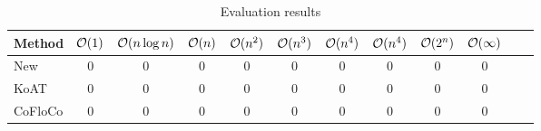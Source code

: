 \begin{table}
  \begin{center}
    \label{tab:evaluation}
    \begin{tabular}{l|c|c|c|c|c|c|c|c|c|c|c}
      Method & $\mathcal{O}(1)$ & $\mathcal{O}(n \log n)$ & $\mathcal{O}(n)$ & $\mathcal{O}(n^2)$ & $\mathcal{O}(n^3)$ & $\mathcal{O}(n^4)$ & $\mathcal{O}(n^4)$ & $\mathcal{O}(2^n)$ & $\mathcal{O}(\infty)$\\
      \hline
      New      & 0 & 0 & 0 & 0 & 0 & 0 & 0 & 0 & 0\\
      KoAT     & 0 & 0 & 0 & 0 & 0 & 0 & 0 & 0 & 0\\
      CoFloCo  & 0 & 0 & 0 & 0 & 0 & 0 & 0 & 0 & 0\\
    \end{tabular}
  \end{center}
  \caption{Evaluation results}
\end{table}

